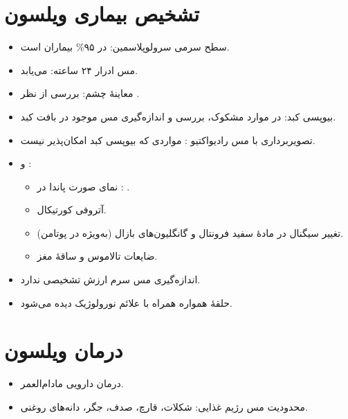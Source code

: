 \documentclass[a4paper,12pt]{extbook}
\begin{document}
\section*{تشخیص بیماری ویلسون}
\begin{itemize}
\item سطح سرمی سرولوپلاسمین: در ۹۵\% بیماران \MDen{$\downarrow$} است.
\item مس ادرار ۲۴ ساعته: \MDen{$\uparrow$} می‌یابد.
\item معاینهٔ چشم: بررسی از نظر .
\item بیوپسی کبد: در موارد مشکوک، بررسی و اندازه‌گیری مس موجود در بافت کبد.
\item تصویربرداری با مس رادیواکتیو : مواردی که بیوپسی کبد امکان‌پذیر نیست.
\item {} و :
\begin{itemize}
\item نمای صورت پاندا در : .
\item آتروفی کورتیکال.
\item تغییر سیگنال در مادهٔ سفید فرونتال و گانگلیون‌های بازال (به‌ویژه در پوتامن).
\item ضایعات تالاموس و ساقهٔ مغز.
\end{itemize}
\item اندازه‌گیری مس سرم ارزش تشخیصی ندارد.
\item حلقهٔ  همواره همراه با علائم نورولوژیک دیده می‌شود.
\end{itemize}
\section*{درمان ویلسون}
\begin{itemize}
\item درمان دارویی مادام‌العمر.
\item محدودیت مس رژیم غذایی: شکلات، قارچ، صدف، جگر، دانه‌های روغنی.
\end{itemize}

\end{document}
